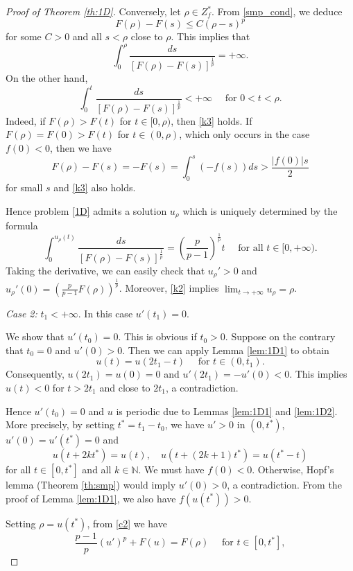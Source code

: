 \documentclass[reqno]{amsart}
\theoremstyle{plain}
\theoremstyle{definition}
\theoremstyle{remark}
\begin{document}
\begin{proof}[Proof of Theorem \ref{th:1D}]
		Conversely, let $\rho\in Z_f^*$. From \eqref{smp_cond}, we deduce
		\[
		F(\rho) - F(s) \le C(\rho - s)^p
		\]
		for some $C>0$ and all $s<\rho$ close to $\rho$. This implies that
		\begin{equation}\label{k2}
			\int_{0}^{\rho} \frac{ds}{\left[F(\rho)-F(s)\right]^\frac{1}{p}} = +\infty.
		\end{equation}
		On the other hand,
		\begin{equation}\label{k3}
			\int_{0}^{t} \frac{ds}{\left[F(\rho)-F(s)\right]^\frac{1}{p}} < +\infty \quad\text{ for } 0<t<\rho.
		\end{equation}
		Indeed, if $F(\rho)>F(t)$ for $t\in[0,\rho)$, then \eqref{k3} holds. If $F(\rho)=F(0)>F(t)$ for $t\in(0,\rho)$, which only occurs in the case $f(0)<0$, then we have
		\[
		F(\rho)-F(s) = -F(s) = \int_{0}^{s} (-f(s))ds > \frac{|f(0)|s}{2}
		\]
		for small $s$ and \eqref{k3} also holds.
		
		Hence problem \eqref{1D} admits a solution $u_\rho$ which is uniquely determined by the formula
		\[
		\int_{0}^{u_\rho(t)} \frac{ds}{\left[F(\rho)-F(s)\right]^\frac{1}{p}} = \left(\frac{p}{p-1}\right)^\frac{1}{p}t \quad\text{ for all } t\in[0,+\infty).
		\]
		Taking the derivative, we can easily check that $u_\rho'>0$ and $u_\rho'(0)=\left(\frac{p}{p-1}F(\rho)\right)^\frac{1}{p}$. Moreover, \eqref{k2} implies $\lim_{t\to+\infty} u_\rho=\rho$.
		
		\textit{Case 2:} $t_1<+\infty$. In this case $u'(t_1)=0$.
		
		We show that $u'(t_0)=0$. This is obvious if $t_0>0$. Suppose on the contrary that $t_0=0$ and $u'(0)>0$. Then we can apply Lemma \ref{lem:1D1} to obtain
		\[
		u(t) = u(2t_1-t) \quad\text{ for } t\in(0, t_1).
		\]
		Consequently, $u(2t_1)=u(0)=0$ and $u'(2t_1)=-u'(0)<0$. This implies $u(t)<0$ for $t>2t_1$ and close to $2t_1$, a contradiction.
		
		Hence $u'(t_0)=0$ and $u$ is periodic due to Lemmas \ref{lem:1D1} and \ref{lem:1D2}.		
		More precisely, by setting $t^*=t_1-t_0$, we have
		$u'>0$ in $(0,t^*)$, $u'(0)=u'(t^*)=0$ and
		\[
		u(t+2kt^*)=u(t), \quad u(t+(2k+1)t^*)=u(t^*-t)
		\]
		for all $t\in[0,t^*]$ and all $k\in\mathbb{N}$. We must have $f(0)<0$. Otherwise, Hopf's lemma (Theorem \ref{th:smp}) would imply $u'(0)>0$, a contradiction. From the proof of Lemma \ref{lem:1D1}, we also have $f(u(t^*))>0$.
		
		Setting $\rho=u(t^*)$, from \eqref{c2} we have
		\begin{equation}\label{k4}
			\frac{p-1}{p} (u')^p + F(u) = F(\rho) \quad\text{ for } t\in[0,t^*],
		\end{equation}
		

\end{proof}
\end{document}
